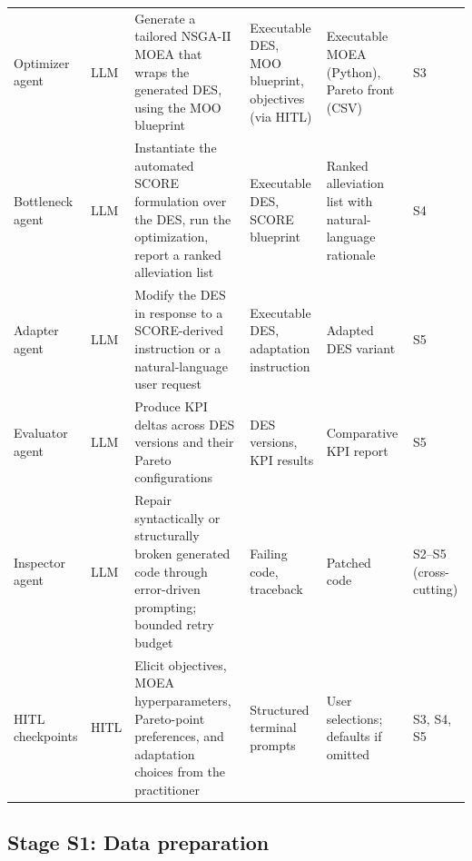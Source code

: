 \documentclass[a4paper,fleqn]{cas-sc}
\begin{document}
\begin{table}[!H]
{\begin{tabular}{p{2.4cm} p{0.8cm} p{4.0cm} p{3.6cm} p{3.6cm} p{1.2cm}}
  Optimizer agent & LLM & Generate a tailored NSGA-II MOEA that wraps the generated DES, using the MOO blueprint &
  Executable DES, MOO blueprint, objectives (via HITL) & Executable MOEA (Python), Pareto front (CSV) & S3 \\           
  \addlinespace                                             
  Bottleneck agent & LLM & Instantiate the automated SCORE formulation over the DES, run the optimization, report a     
  ranked alleviation list & Executable DES, SCORE blueprint & Ranked alleviation list with natural-language rationale & 
  S4 \\ \addlinespace
  Adapter agent & LLM & Modify the DES in response to a SCORE-derived instruction or a natural-language user request &  
  Executable DES, adaptation instruction & Adapted DES variant & S5 \\ \addlinespace                                    
  Evaluator agent & LLM & Produce KPI deltas across DES versions and their Pareto configurations & DES versions, KPI
  results & Comparative KPI report & S5 \\ \addlinespace                                                                
  Inspector agent & LLM & Repair syntactically or structurally broken generated code through error-driven prompting;
  bounded retry budget & Failing code, traceback & Patched code & S2--S5 (cross-cutting) \\ \addlinespace               
  HITL checkpoints & HITL & Elicit objectives, MOEA hyperparameters, Pareto-point preferences, and adaptation choices
  from the practitioner & Structured terminal prompts & User selections; defaults if omitted & S3, S4, S5 \\            
  \bottomrule                                               
  \end{tabular}                                                                                                         
  }                                                                                                                     
  \end{table}                                                                                                           
                                                                                                                        
  \subsection{Stage S1: Data preparation}\label{sec:framework-s1}                                                       
                                                            
\end{document}
